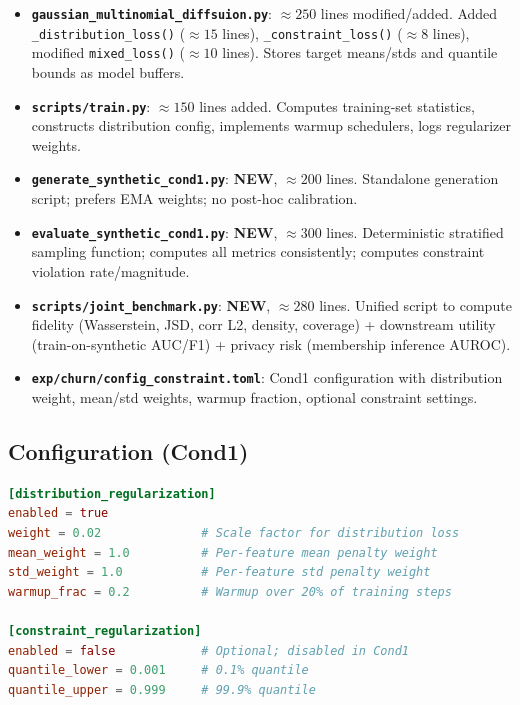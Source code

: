 \documentclass{article}
\begin{document}
\begin{itemize}
  \item \textbf{\texttt{gaussian\_multinomial\_diffsuion.py}}: $\approx 250$ lines modified/added. Added \texttt{\_distribution\_loss()} ($\approx 15$ lines), \texttt{\_constraint\_loss()} ($\approx 8$ lines), modified \texttt{mixed\_loss()} ($\approx 10$ lines). Stores target means/stds and quantile bounds as model buffers.
  
  \item \textbf{\texttt{scripts/train.py}}: $\approx 150$ lines added. Computes training-set statistics, constructs distribution config, implements warmup schedulers, logs regularizer weights.
  
  \item \textbf{\texttt{generate\_synthetic\_cond1.py}}: \textbf{NEW}, $\approx 200$ lines. Standalone generation script; prefers EMA weights; no post-hoc calibration.
  
  \item \textbf{\texttt{evaluate\_synthetic\_cond1.py}}: \textbf{NEW}, $\approx 300$ lines. Deterministic stratified sampling function; computes all metrics consistently; computes constraint violation rate/magnitude.
  
  \item \textbf{\texttt{scripts/joint\_benchmark.py}}: \textbf{NEW}, $\approx 280$ lines. Unified script to compute fidelity (Wasserstein, JSD, corr L2, density, coverage) + downstream utility (train-on-synthetic AUC/F1) + privacy risk (membership inference AUROC).
  
  \item \textbf{\texttt{exp/churn/config\_constraint.toml}}: Cond1 configuration with distribution weight, mean/std weights, warmup fraction, optional constraint settings.
\end{itemize}

\subsection{Configuration (Cond1)}

\begin{lstlisting}[language=toml, breaklines=true]
[distribution_regularization]
enabled = true
weight = 0.02              # Scale factor for distribution loss
mean_weight = 1.0          # Per-feature mean penalty weight
std_weight = 1.0           # Per-feature std penalty weight
warmup_frac = 0.2          # Warmup over 20% of training steps

[constraint_regularization]
enabled = false            # Optional; disabled in Cond1
quantile_lower = 0.001     # 0.1% quantile
quantile_upper = 0.999     # 99.9% quantile
\end{lstlisting}
\end{document}
